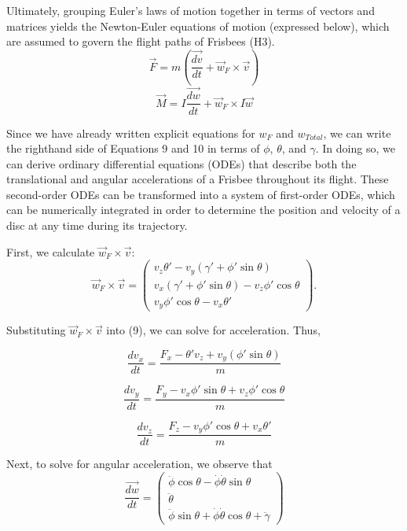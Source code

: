 \documentclass[a4paper,12pt, oneside]{article}
\begin{document}
Ultimately, grouping Euler's laws of motion together in terms of vectors and matrices yields the Newton-Euler equations of motion (expressed below), which are assumed to govern the flight paths of Frisbees (H3). 
\begin{equation}
\vec{F}=\textit{m}(\dfrac{\vec{dv}}{dt}+\vec{\textit{w}}_F\times\vec{v})
\end{equation}
\begin{equation}
\vec{M}=I\dfrac{\vec{dw}}{dt}+\vec{\textit{w}}_F\times I \vec{w}
\end{equation}

Since we have already written explicit equations for $\textit{w}_F$ and $\textit{w}_{Total}$, we can write the righthand side of Equations 9 and 10 in terms of $\phi$, $\theta$, and $\gamma$. In doing so, we can derive ordinary differential equations (ODEs) that describe both the translational and angular accelerations of a Frisbee throughout its flight. These second-order ODEs can be transformed into a system of first-order ODEs, which can be numerically integrated in order to determine the position and velocity of a disc at any time during its trajectory. 

First, we calculate $\vec{w}_F\times\vec{v}$: 
\begin{equation*}
\vec{w}_F\times\vec{v}=\left(\begin{array}{ccc} v_z\theta'-v_y(\gamma'+\phi'\sin\theta) \\ v_x(\gamma'+\phi'\sin\theta)-v_z\phi'\cos\theta \\ v_y\phi'\cos\theta-v_x\theta'\end{array}\right).
\end{equation*}

Substituting $\vec{w}_F\times\vec{v}$ into (9), we can solve for acceleration. Thus,

\begin{equation}
\frac{{dv}_x}{dt}=\frac{{F}_x-\theta'v_z+v_y(\phi'\sin\theta)}{m}
\end{equation}

\begin{equation}
\frac{{dv}_y}{dt}=\frac{F_y-v_x\phi'\sin\theta+v_z\phi'\cos\theta}{m}
\end{equation}

\begin{equation}
\frac{{dv}_z}{dt}=\frac{F_z-v_y\phi'\cos\theta+v_x\theta'}{m}
\end{equation}

Next, to solve for angular acceleration, we observe that 
\begin{equation}
  \label{eq:dwdt}
\frac{\vec{dw}}{dt}=\left(\begin{array}{ccc}\ddot\phi\cos\theta-\dot\phi\dot\theta\sin\theta\\ \ddot\theta \\ \ddot\phi\sin\theta + \dot\phi\dot\theta\cos\theta+\ddot\gamma\end{array} \right)
\end{equation}
\end{document}
